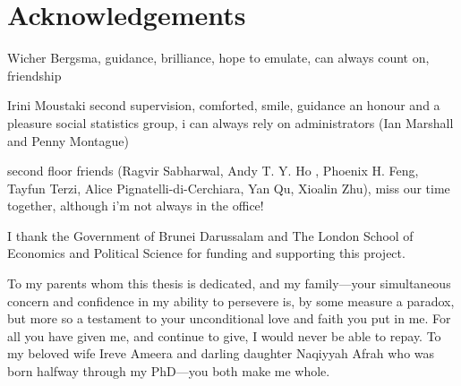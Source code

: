 \documentclass[11pt,twoside,openright,showframe]{report}
\begin{document}
\chapter*{Acknowledgements} 

Wicher Bergsma, guidance, brilliance, hope to emulate, can always count on, friendship

Irini Moustaki second supervision, comforted, smile, guidance 
an honour and a pleasure social statistics group, 
i can always rely on administrators (Ian Marshall and Penny Montague) 

second floor friends (Ragvir Sabharwal, Andy T. Y. Ho , Phoenix H. Feng, Tayfun Terzi, Alice Pignatelli-di-Cerchiara, Yan Qu, Xioalin Zhu), miss our time together, although i'm not always in the office!

I thank the Government of Brunei Darussalam and The London School of Economics and Political Science for funding and supporting this project.

To my parents whom this thesis is dedicated, and my family---your simultaneous concern and confidence in my ability to persevere is, by some measure a paradox, but more so a testament to your unconditional love and faith you put in me.
For all you have given me, and continue to give, I would never be able to repay.
To my beloved wife Ireve Ameera and darling daughter Naqiyyah Afrah who was born halfway through my PhD---you both make me whole.
 





\end{document}

